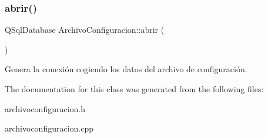 \subsubsection{\texorpdfstring{abrir()}{abrir()}}
{\footnotesize\ttfamily Q\+Sql\+Database Archivo\+Configuracion\+::abrir (\begin{DoxyParamCaption}{ }\end{DoxyParamCaption})}

Genera la conexión cogiendo los datos del archivo de configuración. 

The documentation for this class was generated from the following files\+:\begin{DoxyCompactItemize}
\item 
archivoconfiguracion.\+h\item 
archivoconfiguracion.\+cpp\end{DoxyCompactItemize}
